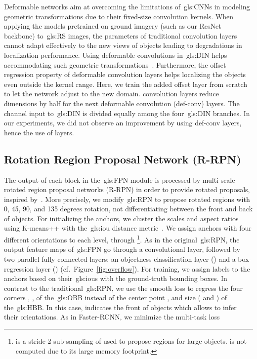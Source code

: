 \documentclass[runningheads]{llncs}
\begin{document}
Deformable networks aim at overcoming the limitations of~\glspl{gls:CNN} in modeling geometric transformations due to their fixed-size convolution kernels.
When applying the models pretrained on ground imagery (such as our ResNet backbone) to~\gls{gls:RS} images, the parameters of traditional convolution layers cannot adapt effectively to the new views of objects leading to degradations in localization performance.
Using deformable convolutions in~\gls{gls:DIN} helps accommodating such geometric transformations~\cite{dai17dcn}.
Furthermore, the offset regression property of deformable convolution layers helps localizing the objects even outside the kernel range. Here, we train the added offset layer from scratch to let the network adjust to the new domain.
 convolution layers reduce dimensions by half for the next deformable convolution (def-conv) layers.
The channel input to~\gls{gls:DIN} is divided equally among the four~\gls{gls:DIN} branches.
In our experiments, we did not observe an improvement by using  def-conv layers, hence the use of  layers.
	
	\subsection{Rotation Region Proposal Network (R-RPN)}
	The output of each  block in the~\gls{gls:FPN} module is processed by multi-scale rotated region proposal networks (R-RPN) in order to provide rotated proposals, inspired by~\cite{Jianqi17RRPN}.
	More precisely, we modify~\gls{gls:RPN} to propose rotated regions with 0, 45, 90, and 135 degrees rotation, not differentiating between the front and back of objects.
    For initializing the anchors, we cluster the scales and aspect ratios using K-means++ with the~\gls{gls:iou} distance metric~\cite{redmon2017yolo9000}.
	We  assign anchors with four different orientations to each level,  through \footnote{ is a stride 2 sub-sampling of  used to propose regions for large objects.  is not computed due to its large memory footprint.}.
	As in the original~\gls{gls:RPN}, the output feature maps of~\gls{gls:FPN} go through a  convolutional layer, followed by two parallel  fully-connected layers: an objectness classification layer () and a box-regression layer () (cf.\ Figure~\ref{fig:overflow}).
	For training, we assign labels to the anchors based on their~\glspl{gls:iou} with the ground-truth bounding boxes.
	In contrast to the traditional~\gls{gls:RPN}, we use the smooth  loss to regress the four corners , , of the~\gls{gls:OBB} instead of the center point , and size ( and ) of the~\gls{gls:HBB}. 
    In this case,  indicates the front of objects which allows to infer their orientations.
    As in Faster-RCNN, we minimize the multi-task loss
	
\end{document}
